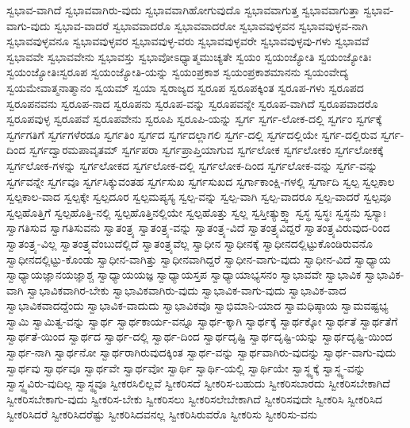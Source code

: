 {ಸ್ವಭಾವ-ವಾಗಿದೆ
ಸ್ವಭಾವವಾಗಿರು-ವುದು
ಸ್ವಭಾವವಾಗಿಹೋಗುವುದೊ
ಸ್ವಭಾವವಾಗುತ್ತ
ಸ್ವಭಾವವಾಗುತ್ತಾ
ಸ್ವಭಾವ-ವಾಗು-ವುದು
ಸ್ವಭಾವ-ವಾದರೆ
ಸ್ವಭಾವವಾದರೊ
ಸ್ವಭಾವವಾದರೋ
ಸ್ವಭಾವವುಳ್ಳವನ
ಸ್ವಭಾವವುಳ್ಳವ-ನಾಗಿ
ಸ್ವಭಾವವುಳ್ಳವನೂ
ಸ್ವಭಾವವುಳ್ಳವರ
ಸ್ವಭಾವವುಳ್ಳ-ವರು
ಸ್ವಭಾವವುಳ್ಳವರೇ
ಸ್ವಭಾವವುಳ್ಳವು-ಗಳು
ಸ್ವಭಾವವೆ
ಸ್ವಭಾವವೇ
ಸ್ವಭಾವವೇನು
ಸ್ವಭಾವಸ್ತು
ಸ್ವಭಾವೋಽಧ್ಯಾತ್ಮಮುಚ್ಯತೇ
ಸ್ವಯಂ
ಸ್ವಯಂಜ್ಯೋತಿ
ಸ್ವಯಂಜ್ಯೋತಿಃ
ಸ್ವಯಂಜ್ಯೋತಿಃಸ್ವರೂಪ
ಸ್ವಯಂಜ್ಯೋತಿ-ಯನ್ನು
ಸ್ವಯಂಪ್ರಕಾಶ
ಸ್ವಯಂಪ್ರಕಾಶಮಾನನು
ಸ್ವಯಂವೇದ್ಯ
ಸ್ವಯಮೇವಾತ್ಮನಾತ್ಮಾನಂ
ಸ್ವಯಮ್
ಸ್ವಯಾ
ಸ್ವರಾಜ್ಯದ
ಸ್ವರೂಪ
ಸ್ವರೂಪಕ್ಕಿಂತ
ಸ್ವರೂಪ-ಗಳು
ಸ್ವರೂಪದ
ಸ್ವರೂಪನವನು
ಸ್ವರೂಪ-ನಾದ
ಸ್ವರೂಪನು
ಸ್ವರೂಪ-ವನ್ನು
ಸ್ವರೂಪವನ್ನೇ
ಸ್ವರೂಪ-ವಾಗಿದೆ
ಸ್ವರೂಪವಾದರೊ
ಸ್ವರೂಪವುಳ್ಳ
ಸ್ವರೂಪವೆ
ಸ್ವರೂಪವೇನು
ಸ್ವರೂಪಿ
ಸ್ವರೂಪಿ-ಯನ್ನು
ಸ್ವರ್ಗ
ಸ್ವರ್ಗ-ಲೋಕ-ದಲ್ಲಿ
ಸ್ವರ್ಗಂ
ಸ್ವರ್ಗಕ್ಕೆ
ಸ್ವರ್ಗಗತಿಗೆ
ಸ್ವರ್ಗಗಳೆರಡೂ
ಸ್ವರ್ಗತಿಂ
ಸ್ವರ್ಗದ
ಸ್ವರ್ಗದಲ್ಲಾಗಲಿ
ಸ್ವರ್ಗ-ದಲ್ಲಿ
ಸ್ವರ್ಗದಲ್ಲಿಯೇ
ಸ್ವರ್ಗ-ದಲ್ಲಿರುವ
ಸ್ವರ್ಗ-ದಿಂದ
ಸ್ವರ್ಗದ್ವಾರಮಪಾವೃತಮ್
ಸ್ವರ್ಗಪರಾ
ಸ್ವರ್ಗಪ್ರಾಪ್ತಿಯಾಗುವ
ಸ್ವರ್ಗಲೋಕ
ಸ್ವರ್ಗಲೋಕಂ
ಸ್ವರ್ಗಲೋಕಕ್ಕೆ
ಸ್ವರ್ಗಲೋಕ-ಗಳನ್ನು
ಸ್ವರ್ಗಲೋಕದ
ಸ್ವರ್ಗಲೋಕ-ದಲ್ಲಿ
ಸ್ವರ್ಗಲೋಕ-ದಿಂದ
ಸ್ವರ್ಗಲೋಕ-ವನ್ನು
ಸ್ವರ್ಗ-ವನ್ನು
ಸ್ವರ್ಗವನ್ನೇ
ಸ್ವರ್ಗವೂ
ಸ್ವರ್ಗಸಿಕ್ಕುವಂತಹ
ಸ್ವರ್ಗಸುಖ
ಸ್ವರ್ಗಸುಖದ
ಸ್ವರ್ಗಾಕಾಂಕ್ಷಿ-ಗಳಲ್ಲಿ
ಸ್ವರ್ಗಾದಿ
ಸ್ವಲ್ಪ
ಸ್ವಲ್ಪಕಾಲ
ಸ್ವಲ್ಪಕಾಲ-ವಾದ
ಸ್ವಲ್ಪಕ್ಕೇ
ಸ್ವಲ್ಪದೂರ
ಸ್ವಲ್ಪಮಪ್ಯಸ್ಯ
ಸ್ವಲ್ಪ-ವನ್ನು
ಸ್ವಲ್ಪ-ವಾಗಿ
ಸ್ವಲ್ಪ-ವಾದರೂ
ಸ್ವಲ್ಪ-ವಾದರೆ
ಸ್ವಲ್ಪವೂ
ಸ್ವಲ್ಪಹೊತ್ತಿಗೆ
ಸ್ವಲ್ಪಹೊತ್ತಿ-ನಲ್ಲಿ
ಸ್ವಲ್ಪಹೊತ್ತಿನಲ್ಲಿಯೇ
ಸ್ವಲ್ಪಹೊತ್ತು
ಸ್ವಲ್ಲ
ಸ್ವಸ್ತೀತ್ಯುಕ್ತ್ವಾ
ಸ್ವಸ್ಥ
ಸ್ವಸ್ಥಃ
ಸ್ವಸ್ಥನು
ಸ್ವಸ್ಯಾಃ
ಸ್ವಾಗತಿಸುವ
ಸ್ವಾಗತಿಸುವನು
ಸ್ವಾತಂತ್ರ್ಯ
ಸ್ವಾತಂತ್ರ್ಯ-ವನ್ನು
ಸ್ವಾತಂತ್ರ್ಯ-ವಿದೆ
ಸ್ವಾತಂತ್ರ್ಯವಿದ್ದರೆ
ಸ್ವಾತಂತ್ರ್ಯವಿರುವುದ-ರಿಂದ
ಸ್ವಾತಂತ್ರ್ಯ-ವಿಲ್ಲ
ಸ್ವಾತಂತ್ರ್ಯವೆಂಬುದೆಲ್ಲಿದೆ
ಸ್ವಾತಂತ್ರ್ಯವೆಲ್ಲ
ಸ್ವಾಧೀನ
ಸ್ವಾಧೀನಕ್ಕೆ
ಸ್ವಾಧೀನದಲ್ಲಿಟ್ಟುಕೊಂಡಿರುವನೊ
ಸ್ವಾಧೀನದಲ್ಲಿಟ್ಟು-ಕೊಂಡು
ಸ್ವಾಧೀನ-ವಾಗಿತ್ತು
ಸ್ವಾಧೀನವಾಗಿದ್ದರೆ
ಸ್ವಾಧೀನ-ವಾಗು-ವುದು
ಸ್ವಾಧೀನ-ವಿದೆ
ಸ್ವಾಧ್ಯಾಯ
ಸ್ವಾಧ್ಯಾಯಜ್ಞಾನಯಜ್ಞಾಶ್ಚ
ಸ್ವಾಧ್ಯಾಯಯಜ್ಞ
ಸ್ವಾಧ್ಯಾಯಸ್ತಪ
ಸ್ವಾಧ್ಯಾಯಾಭ್ಯಸನಂ
ಸ್ವಾಭಾವವೇ
ಸ್ವಾಭಾವಿಕ
ಸ್ವಾಭಾವಿಕ-ವಾಗಿ
ಸ್ವಾಭಾವಿಕವಾಗಿರ-ಬೇಕು
ಸ್ವಾಭಾವಿಕವಾಗಿರು-ವುದು
ಸ್ವಾಭಾವಿಕ-ವಾಗು-ವುದು
ಸ್ವಾಭಾವಿಕ-ವಾದ
ಸ್ವಾಭಾವಿಕವಾದದ್ದೆಂದು
ಸ್ವಾಭಾವಿಕ-ವಾದುದು
ಸ್ವಾಭಾವಿಕವೊ
ಸ್ವಾಭಿಮಾನಿ-ಯಾದ
ಸ್ವಾಮಧಿಷ್ಠಾಯ
ಸ್ವಾಮವಷ್ಟಭ್ಯ
ಸ್ವಾಮಿ
ಸ್ವಾಮಿತ್ವ-ವನ್ನು
ಸ್ವಾರ್ಥ
ಸ್ವಾರ್ಥಕಾರ್ಯ-ವನ್ನೂ
ಸ್ವಾರ್ಥ-ಕ್ಕಾಗಿ
ಸ್ವಾರ್ಥಕ್ಕೆ
ಸ್ವಾರ್ಥಕ್ಕೋ
ಸ್ವಾರ್ಥತೆ
ಸ್ವಾರ್ಥತೆಗೆ
ಸ್ವಾರ್ಥತೆ-ಯಿಂದ
ಸ್ವಾರ್ಥದ
ಸ್ವಾರ್ಥ-ದಲ್ಲಿ
ಸ್ವಾರ್ಥ-ದಿಂದ
ಸ್ವಾರ್ಥದೃಷ್ಟಿ
ಸ್ವಾರ್ಥದೃಷ್ಟಿ-ಯನ್ನು
ಸ್ವಾರ್ಥದೃಷ್ಟಿ-ಯಿಂದ
ಸ್ವಾರ್ಥ-ನಾಗಿ
ಸ್ವಾರ್ಥನೋ
ಸ್ವಾರ್ಥರಾಗಿರುವುದಕ್ಕಿಂತ
ಸ್ವಾರ್ಥ-ವನ್ನು
ಸ್ವಾರ್ಥವಾಗಿರು-ವುದನ್ನು
ಸ್ವಾರ್ಥ-ವಾಗು-ವುದು
ಸ್ವಾರ್ಥವು
ಸ್ವಾರ್ಥವೂ
ಸ್ವಾರ್ಥವೇ
ಸ್ವಾರ್ಥವೋ
ಸ್ವಾರ್ಥಿ
ಸ್ವಾರ್ಥಿ-ಯಲ್ಲಿ
ಸ್ವಾರ್ಥಿಯೇ
ಸ್ವಾಸ್ಥ್ಯಕ್ಕೆ
ಸ್ವಾಸ್ಥ್ಯ-ವನ್ನು
ಸ್ವಾಸ್ಥ್ಯವಿರು-ವುದಿಲ್ಲ
ಸ್ವಾಸ್ಥ್ಯವೂ
ಸ್ವೀಕರಸಿಲಿಲ್ಲವೆ
ಸ್ವೀಕರಿಸದೆ
ಸ್ವೀಕರಿಸ-ಬಹುದು
ಸ್ವೀಕರಿಸಬಾರದು
ಸ್ವೀಕರಿಸಬೇಕಾಗಿದೆ
ಸ್ವೀಕರಿಸಬೇಕಾಗು-ವುದು
ಸ್ವೀಕರಿಸ-ಬೇಕು
ಸ್ವೀಕರಿಸಲು
ಸ್ವೀಕರಿಸಲೇಬೇಕಾಗಿದೆ
ಸ್ವೀಕರಿಸವುದೇ
ಸ್ವೀಕರಿಸಿ
ಸ್ವೀಕರಿಸಿದ
ಸ್ವೀಕರಿಸಿದರೆ
ಸ್ವೀಕರಿಸಿದರೆಷ್ಟು
ಸ್ವೀಕರಿಸಿದವನಲ್ಲ
ಸ್ವೀಕರಿಸಿರುವರೊ
ಸ್ವೀಕರಿಸು
ಸ್ವೀಕರಿಸು-ವನು
}
